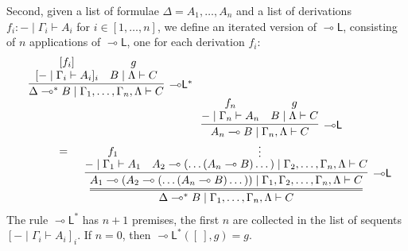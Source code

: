 \documentclass[sn-mathphys-num]{sn-jnl}%
\newcommand{\ldbc}{[\![}
\newcommand{\rdbc}{]\!]}
\newcommand{\GG}{\Gamma}
\newcommand{\GD}{\Delta}
\newcommand{\GL}{\Lambda}
\newcommand{\vd}{\vdash}
\newcommand{\lolli}{\multimap}
\newcommand{\lleft}{{\lolli}\mathsf{L}}
\newcommand{\lright}{{\lolli}\mathsf{R}}
\newcommand{\proofbox}[1]{\begin{tabular}{l} #1 \end{tabular}}
\theoremstyle{thmstyleone}%
\theoremstyle{thmstyletwo}%
\theoremstyle{thmstylethree}%
\newtheorem{definition}[theorem]{Definition}%
\begin{document}
Second, given a list of formulae $\GD = A_1,\dots,A_n$ and a list of derivations $f_i : {-} \mid \GG_i \vd A_i$ for $i \in [1,\dots , n]$, we define an iterated version of $\lleft$, consisting of $n$ applications of $\lleft$, one for each derivation $f_i$:
\begin{equation}\label{-oL*}
  \begin{array}{l}
    \proofbox{\infer[\lleft^*]{\GD \lolli^* B \mid \GG_1,\dots,\GG_n,\GL \vd C}{
    \deduce{[ {-} \mid \GG_i \vd A_i]_i}{[f_i]}
    &
    \deduce{B \mid \GL \vd C}{g}
    }}
    \\
    \qquad \qquad =
    \proofbox{
    \infer={\GD \lolli^* B \mid \GG_1,\dots,\GG_n,\GL \vd C}{
    \infer[\lleft]{A_1 \lolli (A_2 \lolli (\dots (A_n \lolli B) \dots )) \mid \GG_1,\GG_2,\dots,\GG_n,\GL \vd C}{
    \deduce{{-} \mid \GG_1 \vd A_1}{f_1}
    &
    \deduce[\vdots]{A_2 \lolli (\dots (A_n \lolli B) \dots ) \mid \GG_2,\dots,\GG_n,\GL \vd C}{
    \infer[\lleft]{A_n \lolli B \mid \GG_n , \GL \vd C}{
    \deduce{{-} \mid \GG_n \vd A_n}{f_n}
    &
    \deduce{B \mid \GL \vd C}{g}
    }
    }
    }
    }
    }
  \end{array}
\end{equation}
The rule $\lleft^*$ has $n+1$ premises, the first $n$ are collected in the list of sequents $[ {-} \mid \GG_i \vd A_i]_i$.
If $n=0$, then $\lleft^* ([\ ],g) = g$.

\end{document}
